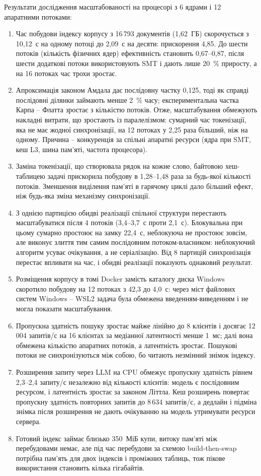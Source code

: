 Результати дослідження масштабованості на процесорі з 6 ядрами і 12 апаратними потоками:
\begin{enumerate}[label=\arabic*)]
\item Час побудови індексу корпусу з 16\,793 документів (1,62~ГБ) скорочується з 10,12~с на
одному потоці до 2,09~с на десяти: прискорення 4,85. До шести потоків (кількість фізичних
ядер) ефективність становить 0,67--0,87, після шести додаткові потоки використовують SMT і
дають лише 20~\% приросту, а на 16 потоках час трохи зростає.
\item Апроксимація законом Амдала дає послідовну частку 0,125, тоді як справді послідовні
ділянки займають менше 2~\% часу; експериментальна частка Карпа -- Флатта зростає з
кількістю потоків. Отже, масштабування обмежують накладні витрати, що зростають із
паралелізмом: сумарний час токенізації, яка не має жодної синхронізації, на 12 потоках у
2,25 раза більший, ніж на одному. Причина -- конкуренція за спільні апаратні ресурси (ядра
при SMT, кеш L3, шина пам'яті, частота процесора).
\item Заміна токенізації, що створювала рядок на кожне слово, байтовою хеш-таблицею задачі
прискорила побудову в 1,28--1,48 раза за будь-якої кількості потоків. Зменшення виділення
пам'яті в гарячому циклі дало більший ефект, ніж будь-яка зміна механізму синхронізації.
\item З однією партицією обидві реалізації спільної структури перестають масштабуватися після
4 потоків (3,4--3,7~с проти 2,1~с). Блокувальна при цьому сумарно простоює на замку 22,4~с,
неблокуюча не простоює зовсім, але виконує злиття тим самим послідовним потоком-власником:
неблокуючий алгоритм усуває очікування, а не серіалізацію. Від 8 партицій синхронізація
перестає впливати на час, і обидві реалізації показують однаковий результат.
\item Розміщення корпусу в томі Docker замість каталогу диска Windows скоротило побудову на
12 потоках з 42,3 до 4,0~с: через міст файлових систем Windows -- WSL2 задача була обмежена
введенням-виведенням і не могла показати масштабування.
\item Пропускна здатність пошуку зростає майже лінійно до 8 клієнтів і досягає 12\,004
запитів/с на 16 клієнтах за медіанної латентності менше 1~мс; далі вона обмежена кількістю
апаратних потоків, а латентність зростає. Пошукові потоки не синхронізуються між собою, бо
читають незмінний знімок індексу.
\item Розширення запиту через LLM на CPU обмежує пропускну здатність рівнем 2,3--2,4 запиту/с
незалежно від кількості клієнтів: модель є послідовним ресурсом, і латентність зростає за
законом Літтла. Кеш розширень повертає пропускну здатність повторних запитів до
8\,634 запитів/с, а дедлайн і підміна знімка після розширення не дають очікуванню на
модель утримувати ресурси сервера.
\item Готовий індекс займає близько 350~МіБ купи, витоку пам'яті між перебудовами немає, але
під час перебудови за схемою build-then-swap потрібна пам'ять для двох індексів і проміжних
таблиць, тож пікове використання становить кілька гігабайтів.
\end{enumerate}


